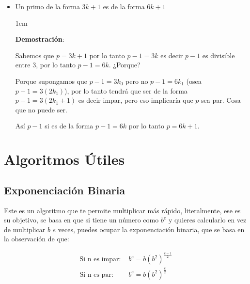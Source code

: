 \documentclass[12pt, fleqn]{report}                             %
\newenvironment{SmallIndentation}[1][0.75em]                    %
    {\begin{adjustwidth}{#1}{}\begin{footnotesize}}                 %
    {\end{footnotesize}\end{adjustwidth}}                           %
\begin{document}
\begin{itemize}
            \item
                Un primo de la forma $3k+1$ es de la forma $6k+1$

                \begin{SmallIndentation}[1em]
                    \textbf{Demostración}:

                    Sabemos que $p = 3k+1$ por lo tanto $p-1 = 3k$ es decir $p-1$ es divisible entre
                    3, por lo tanto $p-1 = 6k$.
                    ¿Porque?

                    Porque supongamos que $p-1=3k_0$ pero no $p-1=6k_1$ (osea $p-1=3(2k_1)$), por lo
                    tanto tendrá que ser de la forma $p-1=3(2k_1+1)$ es decir impar, pero eso
                    implicaría que $p$ sea par. Cosa que no puede ser.

                    Así $p-1$ si es de la forma $p-1=6k$ por lo tanto $p = 6k+1$. 

                \end{SmallIndentation}

        \end{itemize}




\chapter{Algoritmos Útiles}
    \clearpage

    \section{Exponenciación Binaria}

        Este es un algoritmo que te permite multiplicar más rápido, literalmente, ese es 
        su objetivo, se basa en que si tiene un número como $b^e$ y quieres calcularlo
        en vez de multiplicar $b$ $e$ veces, puedes ocupar la exponenciación binaria, 
        que se basa en la observación de que:

        \begin{equation}
        \begin{split}
            \text{Si n es impar: }  &   b^e = b (b^2)^{\frac{e-1}{2}}   \\
            \text{Si n es par: }    &   b^e = b (b^2)^{\frac{e}{2}}
        \end{split}
        \end{equation}
\end{document}
